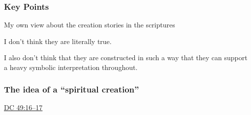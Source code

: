 	\subsubsection{Key Points}
		\label{CREATION-KEYS}
	
		\begin{compactitem}
			\item My own view about the creation stories in the scriptures
				\begin{compactitem}
					\item I don't think they are literally true.
					\item I also don't think that they are constructed in such a way that they can support a heavy symbolic interpretation throughout.
				\end{compactitem}
		\end{compactitem}
		
	\subsubsection{The idea of a ``spiritual creation''}
		\label{CREATION-spiritual}
		
		\begin{compactitem}
			\item \hyperref[DC49-16]{DC 49:16--17}
		\end{compactitem}